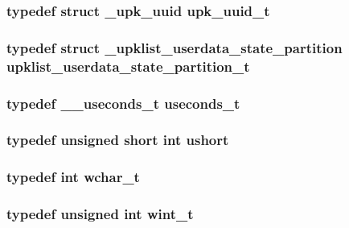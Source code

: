 \subsubsection[{upk\_\-uuid\_\-t}]{\setlength{\rightskip}{0pt plus 5cm}typedef struct {\bf \_\-upk\_\-uuid}  {\bf upk\_\-uuid\_\-t}}\label{tp_8c_ad592133cddb5acf4c36149653d128496}
\subsubsection[{upklist\_\-userdata\_\-state\_\-partition\_\-t}]{\setlength{\rightskip}{0pt plus 5cm}typedef struct {\bf \_\-upklist\_\-userdata\_\-state\_\-partition} {\bf upklist\_\-userdata\_\-state\_\-partition\_\-t}}\label{tp_8c_ac8ca8fd2c894e5c9edd10f8720c1e5d1}
\subsubsection[{useconds\_\-t}]{\setlength{\rightskip}{0pt plus 5cm}typedef {\bf \_\-\_\-useconds\_\-t} {\bf useconds\_\-t}}\label{tp_8c_ade009632006273dfc1a33c2873122258}
\subsubsection[{ushort}]{\setlength{\rightskip}{0pt plus 5cm}typedef unsigned short int {\bf ushort}}\label{tp_8c_a3fa7784c89589b49764048e9909d0e07}
\subsubsection[{wchar\_\-t}]{\setlength{\rightskip}{0pt plus 5cm}typedef int {\bf wchar\_\-t}}\label{tp_8c_a9c277a3fd853029cc853c877bcd32e8e}
\subsubsection[{wint\_\-t}]{\setlength{\rightskip}{0pt plus 5cm}typedef unsigned int {\bf wint\_\-t}}\label{tp_8c_aae8fec8a77257a9718887040067a3f09}


